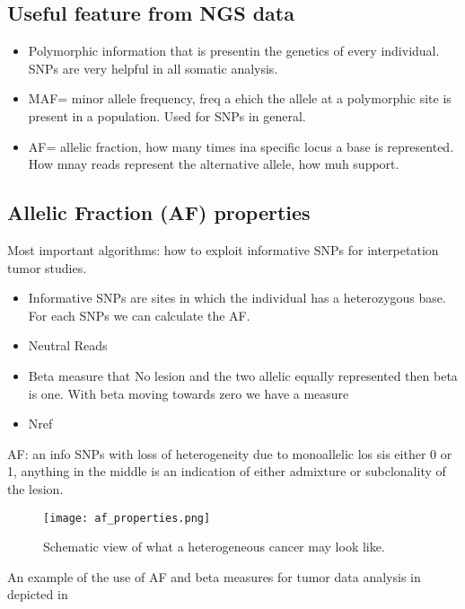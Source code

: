 \subsection{Useful feature from NGS data}
\begin{itemize}
\item Polymorphic information that is presentin the genetics of every individual. SNPs are very helpful in all somatic analysis.
\item MAF= minor allele frequency, freq a ehich the allele at a polymorphic site is present in a population. Used for SNPs in general.
\item AF= allelic fraction, how many times ina specific locus a base is represented. How mnay reads represent the alternative allele, how muh support.
\end{itemize}

\subsection{Allelic Fraction (AF) properties}
Most important algorithms: how to exploit informative SNPs for interpetation tumor studies.\\

\begin{itemize}
\item Informative SNPs are sites in which the individual has a heterozygous base. For each SNPs we can calculate the AF.
\item Neutral Reads
\item Beta measure that No lesion and the two allelic equally represented then beta is one. With beta moving towards zero we have a measure
\item Nref
\end{itemize}

AF: an info SNPs with loss of heterogeneity due to monoallelic los sis either 0 or 1, anything in the middle is an indication of either admixture or subclonality of the lesion.

\begin{figure}[H]
	\centering
	\texttt{[image: af\_properties.png]}
	\caption{\label{fig:af_properties} Schematic view of what a heterogeneous cancer may look like.}
\end{figure}

An example of the use of AF and beta measures for tumor data analysis in depicted in

